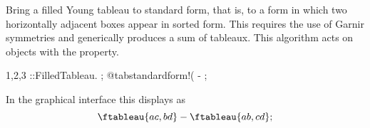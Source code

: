 
Bring a filled Young tableau to standard form, that is, to a form in
which two horizontally adjacent boxes appear in sorted form. This
requires the use of Garnir symmetries and generically produces a sum
of tableaux. This algorithm acts on objects with
the  property.
\begin{screen}{1,2,3}
\tableau{#}::FilledTableau.
;
@tabstandardform!(%
 - ;
\end{screen}
In the graphical interface this displays as
\begin{equation}
\ftableau{{a}{c},{b}{d}} - \ftableau{{a}{b},{c}{d}};
\end{equation}

